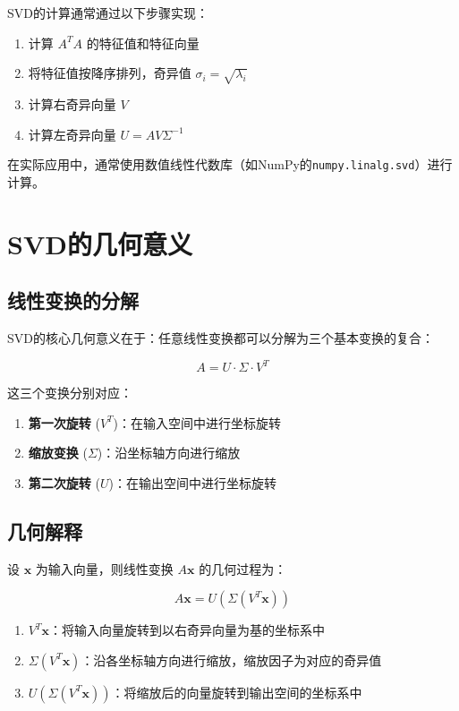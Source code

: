 \documentclass[12pt,a4paper]{article}
\begin{document}
SVD的计算通常通过以下步骤实现：

\begin{enumerate}
    \item 计算 $A^TA$ 的特征值和特征向量
    \item 将特征值按降序排列，奇异值 $\sigma_i = \sqrt{\lambda_i}$
    \item 计算右奇异向量 $V$
    \item 计算左奇异向量 $U = AV\Sigma^{-1}$
\end{enumerate}

在实际应用中，通常使用数值线性代数库（如NumPy的\texttt{numpy.linalg.svd}）进行计算。

\section{SVD的几何意义}

\subsection{线性变换的分解}

SVD的核心几何意义在于：任意线性变换都可以分解为三个基本变换的复合：

\begin{equation}
    A = U \cdot \Sigma \cdot V^T
\end{equation}

这三个变换分别对应：
\begin{enumerate}
    \item \textbf{第一次旋转} ($V^T$)：在输入空间中进行坐标旋转
    \item \textbf{缩放变换} ($\Sigma$)：沿坐标轴方向进行缩放
    \item \textbf{第二次旋转} ($U$)：在输出空间中进行坐标旋转
\end{enumerate}

\subsection{几何解释}

设 $\mathbf{x}$ 为输入向量，则线性变换 $A\mathbf{x}$ 的几何过程为：

\begin{equation}
    A\mathbf{x} = U(\Sigma(V^T\mathbf{x}))
\end{equation}

\begin{enumerate}
    \item $V^T\mathbf{x}$：将输入向量旋转到以右奇异向量为基的坐标系中
    \item $\Sigma(V^T\mathbf{x})$：沿各坐标轴方向进行缩放，缩放因子为对应的奇异值
    \item $U(\Sigma(V^T\mathbf{x}))$：将缩放后的向量旋转到输出空间的坐标系中
\end{enumerate}
\end{document}
